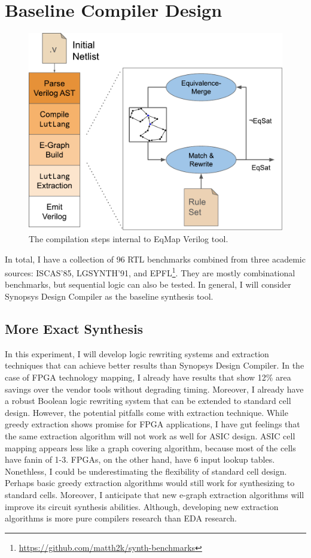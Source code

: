 \documentclass[10pt,letterpaper]{article}
\newcommand{\shortname}{EqMap}
\begin{document}
\section{Baseline Compiler Design}\label{sec:baseline}

\begin{figure}
    \centering
    \includegraphics[width=\textwidth]{img/egraph.pdf}
    \caption{The compilation steps internal to \shortname{} Verilog tool.}\label{fig:flow:egraph}
\end{figure}

In total, I have a collection of 96 RTL benchmarks combined from three academic
sources: ISCAS'85, LGSYNTH'91, and
EPFL\footnote{\href{https://github.com/matth2k/synth-benchmarks}{https://github.com/matth2k/synth-benchmarks}}.
They are mostly combinational benchmarks, but sequential logic can also be
tested. In general, I will consider Synopsys Design Compiler as the baseline
synthesis tool.

\subsection{More Exact Synthesis}
In this experiment, I will develop logic rewriting systems and extraction
techniques that can achieve better results than Synopsys Design Compiler. In
the case of FPGA technology mapping, I already have results that show 12\% area
savings over the vendor tools without degrading timing. Moreover, I already
have a robust Boolean logic rewriting system that can be extended to standard
cell design. However, the potential pitfalls come with extraction technique.
While greedy extraction shows promise for FPGA applications, I have gut
feelings that the same extraction algorithm will not work as well for ASIC
design. ASIC cell mapping appears less like a graph covering algorithm, because
most of the cells have fanin of 1-3. FPGAs, on the other hand, have 6 input
lookup tables. Nonethless, I could be underestimating the flexibility of
standard cell design. Perhaps basic greedy extraction algorithms would still
work for synthesizing to standard cells. Moreover, I anticipate that new
e-graph extraction algorithms will improve its circuit synthesis abilities.
Although, developing new extraction algorithms is more pure compilers research
than EDA research.

\nocite{*}


\end{document}
